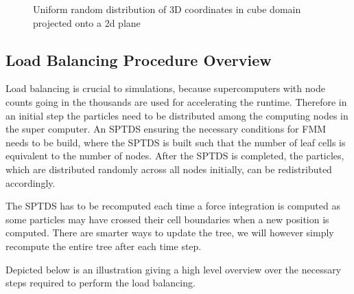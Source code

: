 \documentclass[]{article}
\begin{document}
\begin{figure}[H]
	\begin{center}
	\end{center}
	\caption{Uniform random distribution of 3D coordinates in cube domain projected onto a 2d plane}
\end{figure}

\subsection{Load Balancing Procedure Overview}

Load balancing is crucial to simulations, because supercomputers with node counts going in the thousands are used for accelerating the runtime. Therefore in an initial step the particles need to be distributed among the computing nodes in the super computer. An SPTDS ensuring the necessary conditions for FMM needs to be build, where the SPTDS is built such that the number of leaf cells is equivalent to the number of nodes. After the SPTDS is completed, the particles, which are distributed randomly across all nodes initially, can be redistributed accordingly. 

The SPTDS has to be recomputed each time a force integration is computed as some particles may have crossed their cell boundaries when a new position is computed. There are smarter ways to update the tree, we will however simply recompute the entire tree after each time step.

Depicted below is an illustration giving a high level overview over the necessary steps required to perform the load balancing. 
\end{document}
